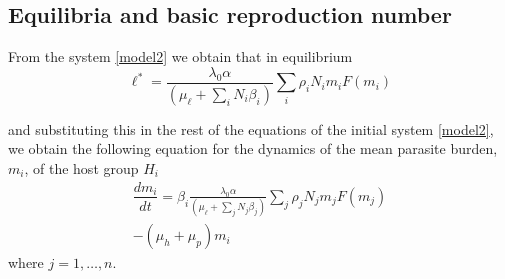 \documentclass[eng]{MMSB-class-eng}
\begin{document}
\subsection{Equilibria and basic reproduction number} 
From the system \eqref{model2} we obtain that in equilibrium
\begin{equation}
\ell^*=\frac{  \lambda_0 \alpha }{(\mu_{\ell}+\sum_i N_i \beta_i  )}   \sum_i \rho_{i} N_{i} m_{i} F(m_{i}) 
\end{equation} 
{\color{red}
and substituting this in the rest of the equations of the initial system \eqref{model2}, we obtain the following equation for the dynamics of the mean parasite burden, $m_{i}$, of the host group $H_{i}$
\begin{multline}\label{dmi}
\dfrac{dm_{i}}{dt}=\beta_{i} \frac{\lambda_0\alpha}{ (\mu_{\ell}+\sum_j N_j \beta_j) }  
\sum_j     \rho_{j} N_j  m_{j} F(m_{j})\\ 
- (\mu_h+\mu_p) m_{i}
\end{multline}
where $j=1,\ldots,n$.

}
\end{document}
